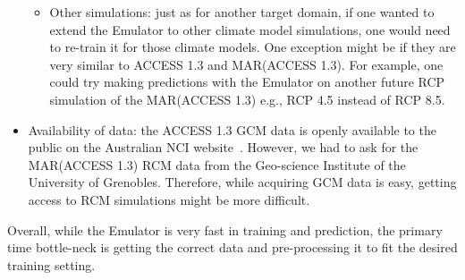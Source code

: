 \documentclass[a4paper,11pt,oneside]{report}
\begin{document}
\begin{itemize}
\begin{itemize}
        \item Other simulations: just as for another target domain, if one wanted to extend the Emulator to other climate model simulations, one would need to re-train it for those climate models. One exception might be if they are very similar to ACCESS 1.3 and MAR(ACCESS 1.3). For example, one could try making predictions with the Emulator on another future RCP simulation of the MAR(ACCESS 1.3) e.g., RCP 4.5 instead of RCP 8.5.  
    \end{itemize}
    \item Availability of data: the ACCESS 1.3 GCM data is openly available to the public on the Australian NCI
    website~\cite{NCI}. However, we had to ask for the MAR(ACCESS 1.3) RCM data from the Geo-science Institute of the University of Grenobles. Therefore, while acquiring GCM data is easy, getting access to RCM simulations might be more difficult.   
\end{itemize}
Overall, while the Emulator is very fast in training and prediction, the primary time bottle-neck is getting the correct data and pre-processing it to fit the desired training setting.  


\end{document}
